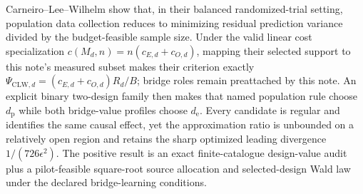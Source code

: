 Carneiro--Lee--Wilhelm show that, in their balanced randomized-trial setting, population data collection reduces to minimizing residual prediction variance divided by the budget-feasible sample size. Under the valid linear cost specialization \(c(M_d,n)=n(c_{E,d}+c_{O,d})\), mapping their selected support to this note's measured subset makes their criterion exactly \(\Psi_{\mathrm{CLW},d}=(c_{E,d}+c_{O,d})R_d/B\); bridge roles remain preattached by this note. An explicit binary two-design family then makes that named population rule choose \(d_{\mathrm p}\) while both bridge-value profiles choose \(d_{\mathrm e}\). Every candidate is regular and identifies the same causal effect, yet the approximation ratio is unbounded on a relatively open region and retains the sharp optimized leading divergence \(1/(726\epsilon^2)\). The positive result is an exact finite-catalogue design-value audit plus a pilot-feasible square-root source allocation and selected-design Wald law under the declared bridge-learning conditions.